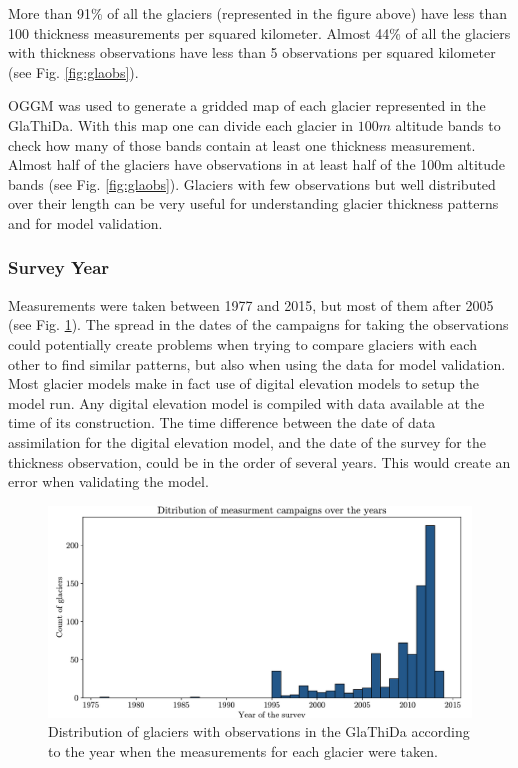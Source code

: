 More than 91\% of all the glaciers (represented in the figure above) have less than 100 thickness measurements per squared kilometer. Almost 44\% of all the glaciers with thickness observations have less than 5 observations per squared kilometer (see Fig. \ref{fig:glaobs}).

OGGM was used to generate a gridded map of each glacier represented in the GlaThiDa. With this map one can divide each glacier in $100m$ altitude bands to check how many of those bands contain at least one thickness measurement.
Almost half of the glaciers have observations in at least half of the 100m altitude bands (see Fig. \ref{fig:glaobs}). Glaciers with few observations but well distributed over their length can be very useful for understanding glacier thickness patterns and for model validation.

\subsubsection{Survey Year}\label{survey-year}
Measurements were taken between 1977 and 2015, but most of them after 2005 (see Fig. \ref{fig:glayears}). The spread in the dates of the campaigns for taking the observations could potentially create problems when trying to compare glaciers with each other to find similar patterns, but also when using the data for model validation.
Most glacier models make in fact use of digital elevation models to setup the model run. Any digital elevation model is compiled with data available at the time of its construction. The time difference between the date of data assimilation for the digital elevation model, and the date of the survey for the thickness observation, could be in the order of several years. This would create an error when validating the model.
\begin{figure}[!tp]
	\centering		  
	\includegraphics[width=1.\textwidth]{figures/Observations_per_year.pdf}
	\caption{Distribution of glaciers with observations in the GlaThiDa according to the year when the measurements for each glacier were taken.}
	\label{fig:glayears}
\end{figure}


